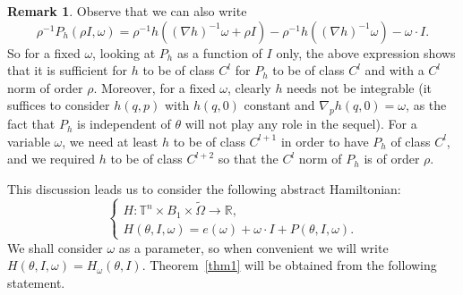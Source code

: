 \documentclass[JEP,XML,SOM,Unicode]{cedram}
\numberwithin{equation}{section}
\theoremstyle{plain}
\theoremstyle{definition}
\newtheorem{remark}[theorem]{Remark}
\newcommand{\R}{\mathbb{R}}
\newcommand\T{\mathbb T}
\begin{document}
\begin{remark}\label{reg}
Observe that we can also write
\[ \rho^{-1}P_h(\rho I,\omega)=\rho^{-1}h((\nabla h)^{-1}\omega+\rho I)-\rho^{-1}h((\nabla h)^{-1}\omega)-\omega\cdot I. \]
So for a fixed $\omega$, looking at $P_h$ as a function of $I$ only, the above expression shows that it is sufficient for $h$ to be of class $C^l$ for $P_h$ to be of class $C^l$ and with a $C^l$ norm of order $\rho$. Moreover, for a fixed $\omega$, clearly $h$ needs not be integrable (it suffices to consider $h(q,p)$ with $h(q,0)$ constant and $\nabla_p h(q,0)=\omega$, as the fact that $P_h$ is independent of $\theta$ will not play any role in the sequel). For a variable $\omega$, we need at least $h$ to be of class $C^{l+1}$ in order to have $P_h$ of class $C^l$, and we required $h$ to be of class $C^{l+2}$ so that the $C^l$ norm of $P_h$ is of order $\rho$.
\end{remark}

This discussion leads us to consider the following abstract Hamiltonian:
\begin{equation}\label{Ham2}
\begin{cases}
H : \T^n \times B_1 \times \tilde{\Omega} \to \R, \\
H(\theta,I,\omega)=e(\omega)+ \omega\cdot I + P(\theta,I,\omega).
\end{cases}\tag{$**$}
\end{equation}
We shall consider $\omega$ as a parameter, so when convenient we will write $H(\theta,I,\omega)=H_\omega(\theta,I)$. Theorem~\ref{thm1} will be obtained from the following statement.
\end{document}
